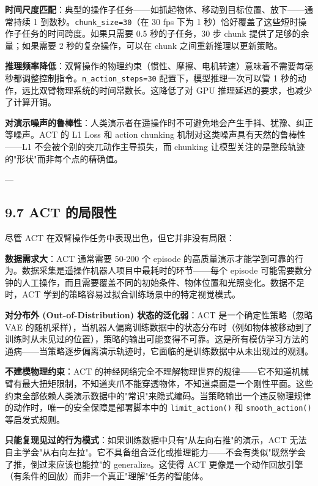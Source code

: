 \documentclass[UTF8,a4paper,11pt]{ctexart}
\begin{document}
{\textbf{时间尺度匹配}：典型的操作子任务——如抓起物体、移动到目标位置、放下——通常持续 1 到数秒。\texttt{chunk_size=30}（在 30 fps 下为 1 秒）恰好覆盖了这些短时操作子任务的时间跨度。如果只需要 0.5 秒的子任务，30 步 chunk 提供了足够的余量；如果需要 2 秒的复杂操作，可以在 chunk 之间重新推理以更新策略。

\textbf{推理频率降低}：双臂操作的物理约束（惯性、摩擦、电机转速）意味着不需要每毫秒都调整控制指令。\texttt{n_action_steps=30} 配置下，模型推理一次可以管 1 秒的动作，远比双臂物理系统的时间常数长。这降低了对 GPU 推理延迟的要求，也减少了计算开销。

\textbf{对演示噪声的鲁棒性}：人类演示者在遥操作时不可避免地会产生手抖、犹豫、纠正等噪声。ACT 的 L1 Loss 和 action chunking 机制对这类噪声具有天然的鲁棒性——L1 不会被个别的突兀动作主导损失，而 chunking 让模型关注的是整段轨迹的"形状"而非每个点的精确值。

---

\subsection{9.7 ACT 的局限性}

尽管 ACT 在双臂操作任务中表现出色，但它并非没有局限：

\textbf{数据需求大}：ACT 通常需要 50-200 个 episode 的高质量演示才能学到可靠的行为。数据采集是遥操作机器人项目中最耗时的环节——每个 episode 可能需要数分钟的人工操作，而且需要覆盖不同的初始条件、物体位置和光照变化。数据不足时，ACT 学到的策略容易过拟合训练场景中的特定视觉模式。

\textbf{对分布外 (Out-of-Distribution) 状态的泛化弱}：ACT 是一个确定性策略（忽略 VAE 的随机采样），当机器人偏离训练数据中的状态分布时（例如物体被移动到了训练时从未见过的位置），策略的输出可能变得不可靠。这是所有模仿学习方法的通病——当策略逐步偏离演示轨迹时，它面临的是训练数据中从未出现过的观测。

\textbf{不建模物理约束}：ACT 的神经网络完全不理解物理世界的规律——它不知道机械臂有最大扭矩限制，不知道夹爪不能穿透物体，不知道桌面是一个刚性平面。这些约束全部依赖人类演示数据中的"常识"来隐式编码。当策略输出一个违反物理规律的动作时，唯一的安全保障是部署脚本中的 \texttt{limit_action()} 和 \texttt{smooth_action()} 等启发式规则。

\textbf{只能复现见过的行为模式}：如果训练数据中只有"从左向右推"的演示，ACT 无法自主学会"从右向左拉"。它不具备组合泛化或推理能力——不会有类似"既然学会了推，倒过来应该也能拉"的 generalize。这使得 ACT 更像是一个动作回放引擎（有条件的回放）而非一个真正"理解"任务的智能体。

}
\end{document}
